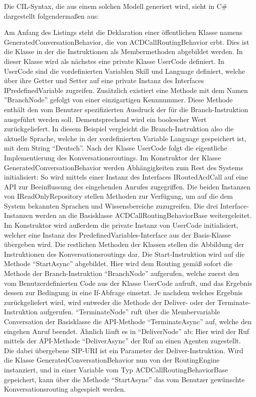 Die CIL-Syntax, die aus einem solchen Modell generiert wird, sieht in C\# dargestellt folgendermaßen aus:



Am Anfang des Listings steht die Deklaration einer öffentlichen Klasse namens GeneratedConversationBehavior, die von ACDCallRoutingBehavior erbt. Dies ist die Klasse in der die Instruktionen als Membermethoden abgebildet werden. In dieser Klasse wird als nächstes eine private Klasse UserCode definiert. In UserCode sind die vordefinierten Variablen Skill und Language definiert, welche über ihre Getter und Setter auf eine private Instanz des Interfaces IPredefinedVariable zugreifen. Zusätzlich existiert eine Methode mit dem Namen ''BranchNode'' gefolgt von einer einzigartigen Kennnummer. Diese Methode enthält den vom Benutzer spezifizierten Ausdruck der für die Branch-Instruktion ausgeführt werden soll. Dementsprechend wird ein boolescher Wert zurückgeliefert. In diesem Beispiel vergleicht die Branch-Instruktion also die aktuelle Sprache, welche in der vordefinierten Variable Language gespeichert ist, mit dem String ``Deutsch''. 
\newline
Nach der Klasse UserCode folgt die eigentliche Implementierung des Konversationsroutings. Im Konstruktor der Klasse GeneratedConversationBehavior werden Abhängigkeiten zum Rest des Systems initialisiert: So wird mittels einer Instanz des Interfaces IRoutedAcdCall auf eine API zur Beeinflussung des eingehenden Anrufes zugegriffen. Die beiden Instanzen von IReadOnlyRepository stellen Methoden zur Verfügung, um auf die dem System bekannten Sprachen und Wissensbereiche zuzugreifen. Die drei Interface-Instanzen werden an die Basisklasse ACDCallRoutingBehaviorBase weitergeleitet. Im Konstruktor wird außerdem die private Instanz von UserCode initialisiert, welcher eine Instanz des PredefinedVariables-Interface aus der Basis-Klasse übergeben wird. Die restlichen Methoden der Klassen stellen die Abbildung der Instruktionen des Konversationsroutings dar. Die Start-Instruktion wird auf die Methode ``StartAsync'' abgebildet. Hier wird dem Routing gemäß sofort die Methode der Branch-Instruktion ``BranchNode'' aufgerufen, welche zuerst den vom Benutzerdefinierten Code aus der Klasse UserCode aufruft, und das Ergebnis dessen zur Bedingung in eine If-Abfrage einsetzt. Je nachdem welches Ergebnis zurückgeliefert wird, wird entweder die Methode der Deliver- oder der Terminate-Instruktion aufgerufen. ``TerminateNode'' ruft über die Membervariable Conversation der Basisklasse die API-Methode ``TerminateAsync'' auf, welche den eingehen Anruf beendet. Ähnlich läuft es in ``DeliverNode'' ab: Hier wird der Ruf mittels der API-Methode ``DeliverAsync'' der Ruf an einen Agenten zugestellt. Die dabei übergebene SIP-URI ist ein Parameter der Deliver-Instruktion.
\newline
Wird die Klasse GeneratedConversationBehavior nun von der RoutingEngine instanziert, und in einer Variable vom Typ ACDCallRoutingBehaviorBase gepeichert, kann über die Methode ``StartAsync'' das vom Benutzer gewünschte Konversationsrouting abgespielt werden.

